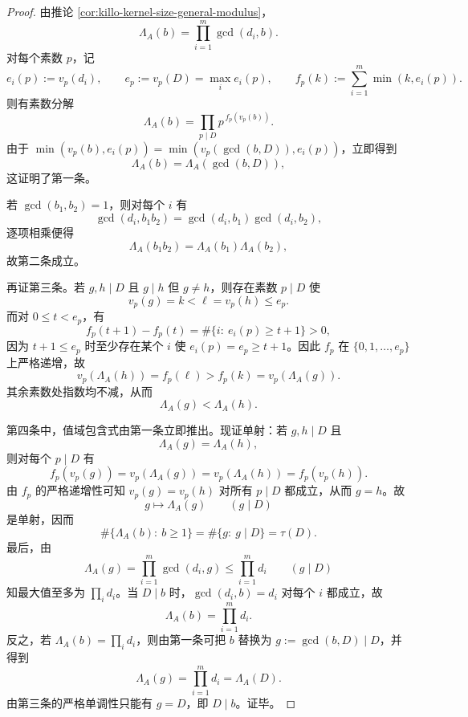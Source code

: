 \begin{proof}
由推论 \ref{cor:killo-kernel-size-general-modulus}，
\[
\Lambda_A(b)=\prod_{i=1}^{m}\gcd(d_i,b).
\]
对每个素数 \(p\)，记
\[
e_i(p):=v_p(d_i),\qquad e_p:=v_p(D)=\max_i e_i(p),
\qquad
f_p(k):=\sum_{i=1}^{m}\min(k,e_i(p)).
\]
则有素数分解
\[
\Lambda_A(b)=\prod_{p\mid D}p^{\,f_p(v_p(b))}.
\]
由于 \(\min(v_p(b),e_i(p))=\min(v_p(\gcd(b,D)),e_i(p))\)，立即得到
\[
\Lambda_A(b)=\Lambda_A(\gcd(b,D)),
\]
这证明了第一条。
\par
若 \(\gcd(b_1,b_2)=1\)，则对每个 \(i\) 有
\[
\gcd(d_i,b_1b_2)=\gcd(d_i,b_1)\gcd(d_i,b_2),
\]
逐项相乘便得
\[
\Lambda_A(b_1b_2)=\Lambda_A(b_1)\Lambda_A(b_2),
\]
故第二条成立。
\par
再证第三条。若 \(g,h\mid D\) 且 \(g\mid h\) 但 \(g\neq h\)，则存在素数 \(p\mid D\) 使
\[
v_p(g)=k<\ell=v_p(h)\le e_p.
\]
而对 \(0\le t<e_p\)，有
\[
f_p(t+1)-f_p(t)=\#\{i:\ e_i(p)\ge t+1\}>0,
\]
因为 \(t+1\le e_p\) 时至少存在某个 \(i\) 使 \(e_i(p)=e_p\ge t+1\)。因此 \(f_p\) 在 \(\{0,1,\dots,e_p\}\) 上严格递增，故
\[
v_p(\Lambda_A(h))=f_p(\ell)>f_p(k)=v_p(\Lambda_A(g)).
\]
其余素数处指数均不减，从而
\[
\Lambda_A(g)<\Lambda_A(h).
\]
\par
第四条中，值域包含式由第一条立即推出。现证单射：若 \(g,h\mid D\) 且
\[
\Lambda_A(g)=\Lambda_A(h),
\]
则对每个 \(p\mid D\) 有
\[
f_p(v_p(g))=v_p(\Lambda_A(g))=v_p(\Lambda_A(h))=f_p(v_p(h)).
\]
由 \(f_p\) 的严格递增性可知 \(v_p(g)=v_p(h)\) 对所有 \(p\mid D\) 都成立，从而 \(g=h\)。故
\[
g\longmapsto \Lambda_A(g)\qquad(g\mid D)
\]
是单射，因而
\[
\#\{\Lambda_A(b):\ b\ge 1\}=\#\{g:\ g\mid D\}=\tau(D).
\]
最后，由
\[
\Lambda_A(g)=\prod_{i=1}^{m}\gcd(d_i,g)\le \prod_{i=1}^{m}d_i
\qquad(g\mid D)
\]
知最大值至多为 \(\prod_i d_i\)。当 \(D\mid b\) 时，\(\gcd(d_i,b)=d_i\) 对每个 \(i\) 都成立，故
\[
\Lambda_A(b)=\prod_{i=1}^{m}d_i.
\]
反之，若 \(\Lambda_A(b)=\prod_i d_i\)，则由第一条可把 \(b\) 替换为 \(g:=\gcd(b,D)\mid D\)，并得到
\[
\Lambda_A(g)=\prod_{i=1}^{m}d_i=\Lambda_A(D).
\]
由第三条的严格单调性只能有 \(g=D\)，即 \(D\mid b\)。证毕。
\end{proof}


